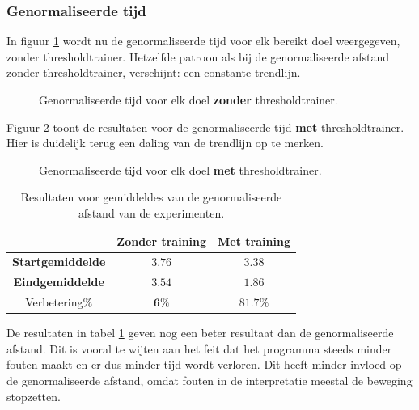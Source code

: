 \documentclass{article}
\newcommand{\figwidth}{0.75\linewidth}
\begin{document}
\subsubsection*{Genormaliseerde tijd}
In figuur \ref{fig:restiment} wordt nu de genormaliseerde tijd voor elk bereikt doel weergegeven, zonder thresholdtrainer. Hetzelfde patroon als bij de genormaliseerde afstand zonder thresholdtrainer, verschijnt: een constante trendlijn.
\begin{figure}[H]
	\centering
	\caption{Genormaliseerde tijd voor elk doel \textbf{zonder} thresholdtrainer.}
	\label{fig:restiment}
\end{figure}
Figuur \ref{fig:restimewt} toont de resultaten voor de genormaliseerde tijd \textbf{met} thresholdtrainer. Hier is duidelijk terug een daling van de trendlijn op te merken.
\begin{figure}[H]
	\centering
	\caption{Genormaliseerde tijd voor elk doel \textbf{met} thresholdtrainer.}
	\label{fig:restimewt}
\end{figure}
\begin{table}[H]
	\begin{tabular}{|c|c|c|}
		\hline  & \textbf{Zonder training} & \textbf{Met training} \\ 
		\hline \textbf{Startgemiddelde} & $3.76$ & $3.38$ \\ 
		\hline \textbf{Eindgemiddelde} & $3.54$ & $1.86$ \\ 
		\hline Verbetering\% & $\mathbf{6}\%$ & $\mathbf{81.7}\%$\\
		\hline
	\end{tabular} 
	\caption{Resultaten voor gemiddeldes van de genormaliseerde afstand van de experimenten.}
	\label{tbl:resgemiddeldestijd}
\end{table}
De resultaten in tabel \ref{tbl:resgemiddeldestijd} geven nog een beter resultaat dan de genormaliseerde afstand. Dit is vooral te wijten aan het feit dat het programma steeds minder fouten maakt en er dus minder tijd wordt verloren. Dit heeft minder invloed op de genormaliseerde afstand, omdat fouten in de interpretatie meestal de beweging stopzetten.
\end{document}
